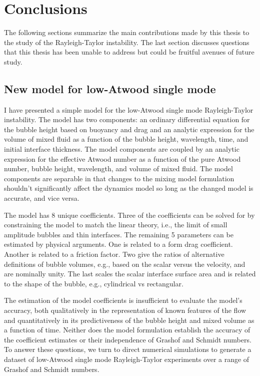 \chapter{Conclusions}

The following sections summarize the main contributions made by this thesis to the study of the Rayleigh-Taylor instability.
The last section discusses questions that this thesis has been unable to address but could be fruitful avenues of future study.

\section{New model for low-Atwood single mode}
I have presented a simple model for the low-Atwood single mode Rayleigh-Taylor instability.
The model has two components: an ordinary differential equation for the bubble height based on buoyancy and drag and an analytic expression for the volume of mixed fluid as a function of the bubble height, wavelength, time, and initial interface thickness.
The model components are coupled by an analytic expression for the effective Atwood number as a function of the pure Atwood number, bubble height, wavelength, and volume of mixed fluid.
The model components are separable in that changes to the mixing model formulation shouldn't significantly affect the dynamics model so long as the changed model is accurate, and vice versa.

The model has 8 unique coefficients.
Three of the coefficients can be solved for by constraining the model to match the linear theory, i.e., the limit of small amplitude bubbles and thin interfaces.
The remaining 5 parameters can be estimated by physical arguments.
One is related to a form drag coefficient.
Another is related to a friction factor.
Two give the ratios of alternative definitions of bubble volumes, e.g., based on the scalar versus the velocity, and are nominally unity.
The last scales the scalar interface surface area and is related to the shape of the bubble, e.g., cylindrical vs rectangular.

The estimation of the model coefficients is insufficient to evaluate the model's accuracy, both qualitatively in the representation of known features of the flow and quantitatively in its predictiveness of the bubble height and mixed volume as a function of time.
Neither does the model formulation establish the accuracy of the coefficient estimates or their independence of Grashof and Schmidt numbers.
To answer these questions, we turn to direct numerical simulations to generate a dataset of low-Atwood single mode Rayleigh-Taylor experiments over a range of Grashof and Schmidt numbers.

